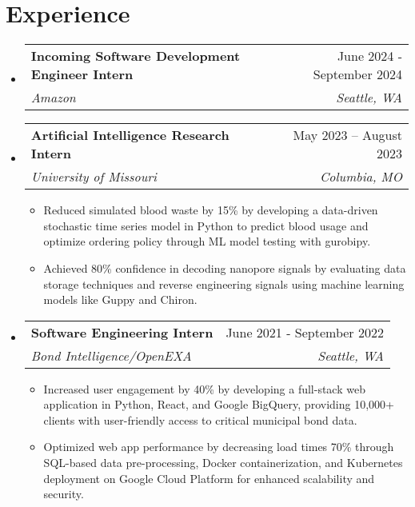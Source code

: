 \documentclass[letterpaper,11pt]{article}
\makeatletter
\newcommand{\resumeItem}[1]{
  \item\small{
    {#1 \vspace{-2pt}}
  }
}
\newcommand{\resumeSubheading}[4]{
  \vspace{-2pt}\item
    \begin{tabular*}{0.97\textwidth}[t]{l@{\extracolsep{\fill}}r}
      \textbf{#1} & #2 \\
      \textit{\small#3} & \textit{\small #4} \\
    \end{tabular*}\vspace{-7pt}
}
\newcommand{\resumeSubHeadingListStart}{\begin{itemize}[leftmargin=0.15in, label={}]}
\newcommand{\resumeSubHeadingListEnd}{\end{itemize}}
\newcommand{\resumeItemListStart}{\begin{itemize}}
\newcommand{\resumeItemListEnd}{\end{itemize}\vspace{-5pt}}
\makeatother
\begin{document}
\section{Experience}
  \resumeSubHeadingListStart
  \resumeSubheading{Incoming Software Development Engineer Intern}{June 2024 - September 2024}{Amazon}{Seattle, WA}
    \resumeSubheading
      {Artificial Intelligence Research Intern}{May 2023 – August 2023}
      {University of Missouri}{Columbia, MO}
        \resumeItemListStart
            \resumeItem{Reduced simulated blood waste by 15\% by developing a data-driven stochastic time series model in Python to predict blood usage and optimize ordering policy through ML model testing with gurobipy.} 
            \resumeItem{Achieved 80\% confidence in decoding nanopore signals by evaluating data storage techniques and reverse engineering signals using machine learning models like Guppy and Chiron.}
      \resumeItemListEnd
    \resumeSubheading
      {Software Engineering Intern}{June 2021 - September 2022}
      {Bond Intelligence/OpenEXA}{Seattle, WA}
      \resumeItemListStart
      \resumeItem{Increased user engagement by 40\% by developing a full-stack web application in Python, React, and Google BigQuery, providing 10,000+ clients with user-friendly access to critical municipal bond data.}

\resumeItem{Optimized web app performance by decreasing load times 70\% through SQL-based data pre-processing, Docker containerization, and Kubernetes deployment on Google Cloud Platform for enhanced scalability and security.}
      \resumeItemListEnd
    \resumeSubHeadingListEnd
\end{document}
